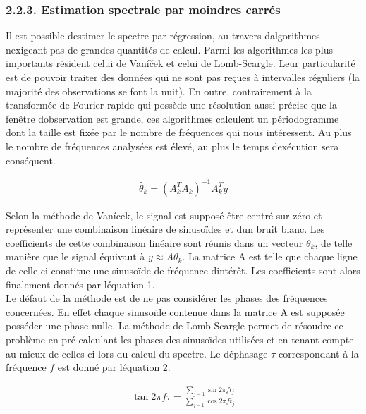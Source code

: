 \documentclass[letterpaper]{article}
\begin{document}
\subsubsection*{2.2.3. Estimation spectrale par moindres carrés}

Il est possible d\textquotesingle estimer le spectre par régression, au travers d\textquotesingle algorithmes n\textquotesingle exigeant
pas de grandes quantités de calcul. Parmi les algorithmes les plus importants résident celui de Vaníček et celui de Lomb-Scargle. Leur particularité est
de pouvoir traiter des données qui ne sont pas reçues à intervalles réguliers (la majorité des observations se font la nuit). En outre, contrairement à la transformée de Fourier rapide qui possède une résolution aussi précise que la fenêtre d\textquotesingle observation est grande, ces algorithmes
calculent un périodogramme dont la taille est fixée par le nombre de fréquences qui nous intéressent. Au plus le nombre de fréquences analysées est
élevé, au plus le temps d\textquotesingle exécution sera conséquent.

\begin{align}
\hat{\theta}_{k} = (A_{k}^{T} A_{k})^{-1} A_{k}^{T} y
\end{align}

Selon la méthode de Vanícek, le signal est supposé être centré sur zéro et représenter une combinaison linéaire de sinusoïdes et d\textquotesingle un bruit blanc.
Les coefficients de cette combinaison linéaire sont réunis dans un vecteur $\theta_{k}$, de telle manière que le signal équivaut à $y \approx A\theta_{k}$.
La matrice A est telle que chaque ligne de celle-ci constitue une sinusoïde de fréquence d\textquotesingle intérêt. Les coefficients sont alors finalement
donnés par l\textquotesingle équation 1. \citep{PS}\\

Le défaut de la méthode est de ne pas considérer les phases des fréquences concernées. En effet chaque sinusoïde contenue dans la matrice A
est supposée posséder une phase nulle. La méthode de Lomb-Scargle permet de résoudre ce problème en pré-calculant les phases des sinusoïdes
utilisées et en tenant compte au mieux de celles-ci lors du calcul du spectre. Le déphasage $\tau$ correspondant à la fréquence $f$ est donné par
l\textquotesingle équation 2. \citep{LS}

\begin{align}
\tan 2\pi f \tau = \frac{\sum\limits_{j=1} \sin 2\pi f t_{j}}{\sum\limits_{j=1} \cos 2\pi f t_{j}}
\end{align}
\end{document}
